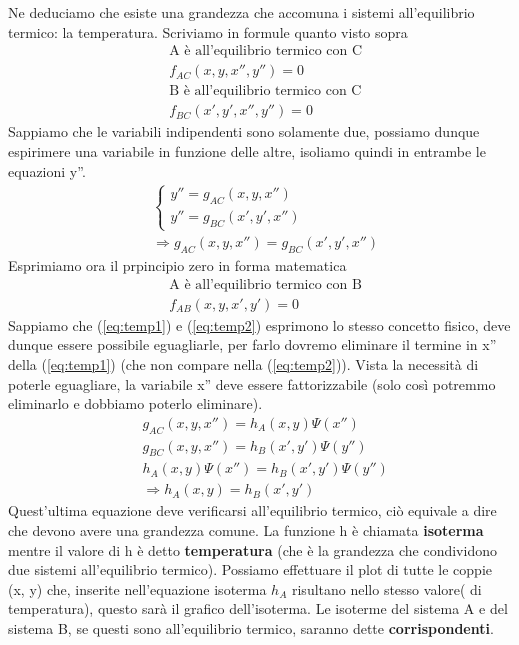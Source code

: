 \documentclass[
10pt, %
a4paper, %
oneside, %
headinclude,footinclude, %
BCOR5mm, %
]{scrartcl}
\begin{document}
Ne deduciamo che esiste una grandezza che accomuna i sistemi all'equilibrio termico: la temperatura. Scriviamo in formule quanto visto sopra
\begin{align*} 
	&\text{A è all'equilibrio termico con C}\\
	&f_{AC}(x, y, x'', y'') = 0\\
	&\text{B è all'equilibrio termico con C}\\
	&f_{BC}(x', y', x'', y'') = 0
\end{align*} 
Sappiamo che le variabili indipendenti sono solamente due, possiamo dunque espirimere una variabile in funzione delle altre, isoliamo quindi in entrambe le equazioni y''. 
\begin{align}\label{eq:temp1}
	&\begin{cases}
		y'' = g_{AC}(x, y, x'')\\
		y'' = g_{BC}(x', y', x'')
	\end{cases}\\\nonumber
	&\Rightarrow g_{AC}(x, y, x'')=  g_{BC}(x', y', x'')
\end{align} 
Esprimiamo ora il prpincipio zero in forma matematica
\begin{align}\label{eq:temp2}
	&\text{A è all'equilibrio termico con B}\\ \nonumber
	&f_{AB}(x,y, x', y') = 0
\end{align} 
Sappiamo che (\ref{eq:temp1}) e (\ref{eq:temp2}) esprimono lo stesso concetto fisico, deve dunque essere possibile eguagliarle, per farlo dovremo eliminare il termine in x'' della (\ref{eq:temp1}) (che non compare nella (\ref{eq:temp2})). Vista la necessità di poterle eguagliare, la variabile x''  deve essere fattorizzabile (solo così potremmo eliminarlo e dobbiamo poterlo eliminare).
\begin{align*} 
	&g_{AC}(x, y, x'')=h_A(x, y) \Psi(x'') \\
	&g_{BC}(x, y, x'')=h_B(x', y') \Psi(y'')\\
	&h_A(x, y) \Psi(x'')=h_B(x', y') \Psi(y'')\\
	&\Rightarrow h_A(x, y) = h_B(x', y')
\end{align*} 
Quest'ultima equazione deve verificarsi all'equilibrio termico, ciò equivale a dire che devono avere una grandezza comune. La funzione h è chiamata \textbf{isoterma} mentre il valore di h è detto \textbf{temperatura} (che è la grandezza che condividono due sistemi all'equilibrio termico). Possiamo effettuare il plot di tutte le coppie (x, y) che, inserite nell'equazione isoterma $h_A$ risultano nello stesso valore( di temperatura), questo sarà il grafico dell'isoterma. Le isoterme del sistema A e del sistema B, se questi sono all'equilibrio termico, saranno dette \textbf{corrispondenti}. 
\end{document}

